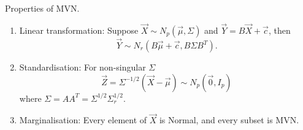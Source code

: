\documentclass[10pt, a4paper]{article}
\begin{document}
\begin{proposition}
    Properties of MVN.

    \begin{enumerate}[label = (\roman*)]
        \item Linear transformation:
        Suppose $\vec{X} \sim N_p(\vec{\mu}, \Sigma)$ and $\vec{Y} = B\vec{X} + \vec{c}$,
        then
        \[
        \vec{Y} \sim N_{r}(B\vec{\mu} + \vec{c}, B\Sigma B ^ T).
        \]

        \item Standardisation:
        For non-singular $\Sigma$
        \[
        \vec{Z} = \Sigma ^ {-1 / 2}(\vec{X} - \vec{\mu}) \sim N_p(\vec{0}, I_p)
        \]
        where $\Sigma = AA ^ T = \Sigma ^ {1 / 2}\Sigma_r ^ {1 / 2}$.

        \item Marginalisation:
        Every element of $\vec{X}$ is Normal,
        and every subset is MVN.
    \end{enumerate}
\end{proposition}
\end{document}

